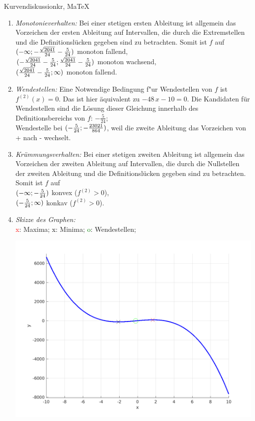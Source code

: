 \begin{MAufgabe}{Kurvendiskussion}{kr, MaTeX}
\begin{enumerate}
 \item \emph{Monotonieverhalten:} 
 Bei einer stetigen ersten Ableitung ist allgemein das Vorzeichen der ersten Ableitung auf Intervallen, die durch die Extremstellen und die Definitionsl\"ucken gegeben sind zu betrachten. Somit ist $f$ auf \\ 
 $(-\infty; - \frac{\sqrt{2041}}{24} - \frac{5}{24})$ monoton fallend, \\ 
 $( - \frac{\sqrt{2041}}{24} - \frac{5}{24};\frac{\sqrt{2041}}{24} - \frac{5}{24})$ monoton  wachsend, \\ 
 $(\frac{\sqrt{2041}}{24} - \frac{5}{24}; \infty)$ monoton fallend. \\ 
 \item \emph{Wendestellen:} 
 Eine Notwendige Bedingung f"ur Wendestellen von $f$ ist $f^{(2)}(x)=0$. 
 Das ist hier \"aquivalent zu $ - 48\, x - 10=0$. 
 Die Kandidaten f\"ur Wendestellen sind die L\"osung dieser Gleichung innerhalb des Definitionsbereichs von $f$: $- \frac{5}{24}$; \\ 
 Wendestelle bei $(- \frac{5}{24};- \frac{23021}{864})$, weil die zweite Ableitung das Vorzeichen von + nach - wechselt. \\ 
 \item \emph{Kr\"ummungsverhalten:} 
 Bei einer stetigen zweiten Ableitung ist allgemein das Vorzeichen der zweiten Ableitung auf Intervallen, die durch die Nullstellen der zweiten Ableitung und die Definitionsl\"ucken gegeben sind zu betrachten. 
 Somit ist $f$ auf \\ 
 $(-\infty ;- \frac{5}{24})$  konvex ($f^{(2)}>0$), \\ 
 $(- \frac{5}{24}; \infty)$  konkav ($f^{(2)}>0$). \\ 
 \item \emph{Skizze des Graphen:} \\ 
 {\textcolor{red} x}: Maxima; {\textcolor{black} x}: Minima; {\textcolor{green} o}: Wendestellen; 
  \begin{center}
  \includegraphics[width=0.8\linewidth]{Abb_zur_Ag_autogenerated_fractions_13.png} \end{center}
  
 \end{enumerate}
 \else\relax\fi
  \end{MAufgabe}